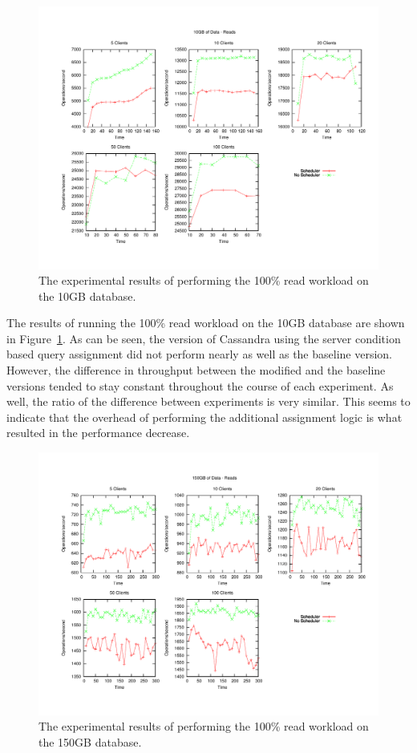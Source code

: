 \begin{figure}[t]
\centering
\includegraphics[scale=0.563]{images/10GB_Reads.pdf}
\vspace{-15pt}
\caption{The experimental results of performing the 100\% read workload on the 10GB database.}
\label{fig:10g_reads}
\end{figure}

The results of running the 100\% read workload on the 10GB database are shown in Figure~\ref{fig:10g_reads}. As can be seen, the version of Cassandra using the server condition based query assignment did not perform nearly as well as the baseline version. However, the difference in throughput between the modified and the baseline versions tended to stay constant throughout the course of each experiment. As well, the ratio of the difference between experiments is very similar. This seems to indicate that the overhead of performing the additional assignment logic is what resulted in the performance decrease.

\begin{figure}[t]
\centering
\includegraphics[scale=0.563]{images/150GB_Reads.pdf}
\vspace{-15pt}
\caption{The experimental results of performing the 100\% read workload on the 150GB database.}
\label{fig:150g_reads}
\end{figure}

